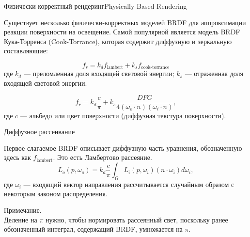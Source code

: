 \documentclass{beamer}
\begin{document}
	\begin{frame}{Физически-корректный рендеринг}{Physically-Based Rendering}

		Существует несколько физически-корректных моделей BRDF для аппроксимации реакции поверхности на освещение. Самой популярной является модель BRDF Кука-Торренса 
		(Cook-Torrance), которая содержит диффузную и зеркальную составляющие:
		
		\[
			f_r =
			k_d f_{\text{lambert}}
			+
			k_s f_{\text{cook-torrance}} 	
		\]
		где 
		$k_d$ --- преломленная доля входящей световой энергии;
		$k_s$ --- отраженная доля входящей световой энергии.

		\[
			f_r =
			k_d \frac{c}{\pi} 
			+
			k_s \frac{DFG}{4 (\omega_o \cdot n) (\omega_i \cdot n)} 	
		,
			\]
		где 
		$c$ --- альбедо или цвет поверхности (диффузная текстура поверхности).

		
		
		
		\note{


			

	
			
		}
	\end{frame}

	\begin{frame}{Диффузное рассеивание}

		Первое слагаемое BRDF описывает диффузную часть уравнения, обозначенную здесь как $f_{\text{lambert}}$. Это есть Ламбертово рассеяние.
		\[
				L_o(p,\omega_o) = k_d \frac{c}{\pi}
				\int_{\Omega}
				L_i(p, \omega_i) (n \cdot \omega_i) d \omega_i
			,
			\]
			где 
			$\omega_i$ --- входящий вектор направления рассчитывается случайным образом с некоторым законом распределения.

			Примечание. \\
			Деление на $\pi$ нужно, чтобы нормировать рассеянный свет, поскольку ранее обозначенный интеграл, содержащий BRDF, умножается на $\pi$.

	\end{frame}
\end{document}
